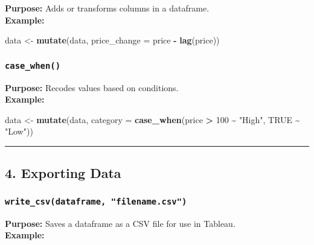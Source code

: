 \documentclass[
  11pt,
]{article}
\newenvironment{Shaded}{\begin{snugshade}}{\end{snugshade}}
\newcommand{\AttributeTok}[1]{\textcolor[rgb]{0.13,0.29,0.53}{#1}}
\newcommand{\ConstantTok}[1]{\textcolor[rgb]{0.56,0.35,0.01}{#1}}
\newcommand{\DecValTok}[1]{\textcolor[rgb]{0.00,0.00,0.81}{#1}}
\newcommand{\FunctionTok}[1]{\textcolor[rgb]{0.13,0.29,0.53}{\textbf{#1}}}
\newcommand{\NormalTok}[1]{#1}
\newcommand{\OtherTok}[1]{\textcolor[rgb]{0.56,0.35,0.01}{#1}}
\newcommand{\SpecialCharTok}[1]{\textcolor[rgb]{0.81,0.36,0.00}{\textbf{#1}}}
\newcommand{\StringTok}[1]{\textcolor[rgb]{0.31,0.60,0.02}{#1}}
\begin{document}
\textbf{Purpose:} Adds or transforms columns in a dataframe.\\
\textbf{Example:}

\begin{Shaded}
\begin{Highlighting}[]
\NormalTok{data }\OtherTok{\textless{}{-}} \FunctionTok{mutate}\NormalTok{(data, }\AttributeTok{price\_change =}\NormalTok{ price }\SpecialCharTok{{-}} \FunctionTok{lag}\NormalTok{(price))}
\end{Highlighting}
\end{Shaded}

\subsubsection{\texorpdfstring{\textbf{\texttt{case\_when()}}}{case\_when()}}\label{case_when}

\textbf{Purpose:} Recodes values based on conditions.\\
\textbf{Example:}

\begin{Shaded}
\begin{Highlighting}[]
\NormalTok{data }\OtherTok{\textless{}{-}} \FunctionTok{mutate}\NormalTok{(data, }\AttributeTok{category =} \FunctionTok{case\_when}\NormalTok{(price }\SpecialCharTok{\textgreater{}} \DecValTok{100} \SpecialCharTok{\textasciitilde{}} \StringTok{"High"}\NormalTok{, }\ConstantTok{TRUE} \SpecialCharTok{\textasciitilde{}} \StringTok{"Low"}\NormalTok{))}
\end{Highlighting}
\end{Shaded}

\begin{center}\rule{0.5\linewidth}{0.5pt}\end{center}

\subsection{\texorpdfstring{\textbf{4. Exporting
Data}}{4. Exporting Data}}\label{exporting-data}

\subsubsection{\texorpdfstring{\textbf{\texttt{write\_csv(dataframe,\ "filename.csv")}}}{write\_csv(dataframe, "filename.csv")}}\label{write_csvdataframe-filename.csv}

\textbf{Purpose:} Saves a dataframe as a CSV file for use in Tableau.\\
\textbf{Example:}
\end{document}
